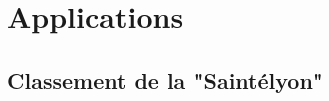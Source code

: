 \section{Applications}
\subsection{Classement de la "Saintélyon"}
\setcounter{thequestion}{0}

\subsection{}
\setcounter{thequestion}{0}

